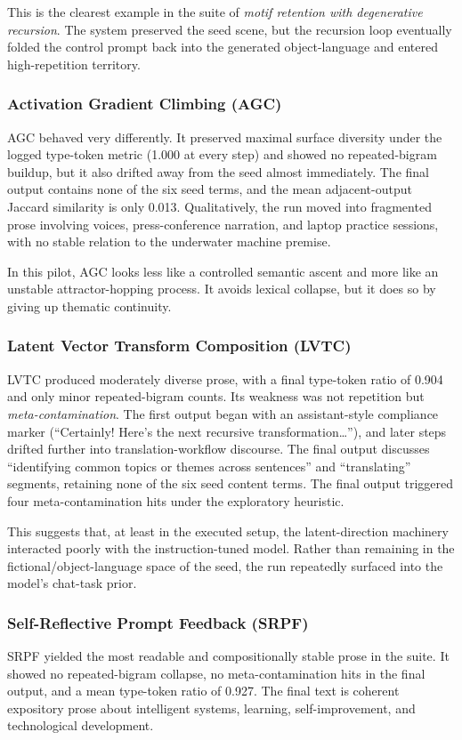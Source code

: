 \documentclass[11pt]{article}
\begin{document}
This is the clearest example in the suite of \emph{motif retention with degenerative recursion}. The system preserved the seed scene, but the recursion loop eventually folded the control prompt back into the generated object-language and entered high-repetition territory.

\subsubsection{Activation Gradient Climbing (AGC)}
AGC behaved very differently. It preserved maximal surface diversity under the logged type-token metric (1.000 at every step) and showed no repeated-bigram buildup, but it also drifted away from the seed almost immediately. The final output contains none of the six seed terms, and the mean adjacent-output Jaccard similarity is only 0.013. Qualitatively, the run moved into fragmented prose involving voices, press-conference narration, and laptop practice sessions, with no stable relation to the underwater machine premise.

In this pilot, AGC looks less like a controlled semantic ascent and more like an unstable attractor-hopping process. It avoids lexical collapse, but it does so by giving up thematic continuity.

\subsubsection{Latent Vector Transform Composition (LVTC)}
LVTC produced moderately diverse prose, with a final type-token ratio of 0.904 and only minor repeated-bigram counts. Its weakness was not repetition but \emph{meta-contamination}. The first output began with an assistant-style compliance marker (``Certainly! Here's the next recursive transformation\ldots''), and later steps drifted further into translation-workflow discourse. The final output discusses ``identifying common topics or themes across sentences'' and ``translating'' segments, retaining none of the six seed content terms. The final output triggered four meta-contamination hits under the exploratory heuristic.

This suggests that, at least in the executed setup, the latent-direction machinery interacted poorly with the instruction-tuned model. Rather than remaining in the fictional/object-language space of the seed, the run repeatedly surfaced into the model's chat-task prior.

\subsubsection{Self-Reflective Prompt Feedback (SRPF)}
SRPF yielded the most readable and compositionally stable prose in the suite. It showed no repeated-bigram collapse, no meta-contamination hits in the final output, and a mean type-token ratio of 0.927. The final text is coherent expository prose about intelligent systems, learning, self-improvement, and technological development.
\end{document}
